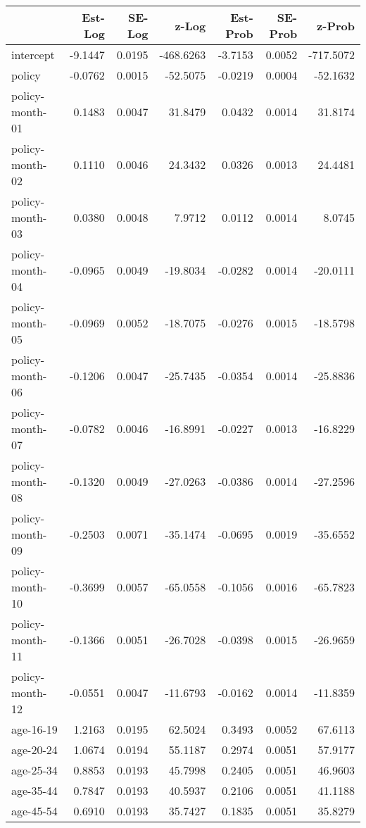 \documentclass[10pt]{article}
\begin{document}

\begin{table}[ht]
\centering
\begin{tabular}{lrrrrrr}
  \hline
 & Est-Log & SE-Log & z-Log & Est-Prob & SE-Prob & z-Prob \\ 
  \hline
intercept & -9.1447 & 0.0195 & -468.6263 & -3.7153 & 0.0052 & -717.5072 \\ 
  policy & -0.0762 & 0.0015 & -52.5075 & -0.0219 & 0.0004 & -52.1632 \\ 
  policy-month-01 & 0.1483 & 0.0047 & 31.8479 & 0.0432 & 0.0014 & 31.8174 \\ 
  policy-month-02 & 0.1110 & 0.0046 & 24.3432 & 0.0326 & 0.0013 & 24.4481 \\ 
  policy-month-03 & 0.0380 & 0.0048 & 7.9712 & 0.0112 & 0.0014 & 8.0745 \\ 
  policy-month-04 & -0.0965 & 0.0049 & -19.8034 & -0.0282 & 0.0014 & -20.0111 \\ 
  policy-month-05 & -0.0969 & 0.0052 & -18.7075 & -0.0276 & 0.0015 & -18.5798 \\ 
  policy-month-06 & -0.1206 & 0.0047 & -25.7435 & -0.0354 & 0.0014 & -25.8836 \\ 
  policy-month-07 & -0.0782 & 0.0046 & -16.8991 & -0.0227 & 0.0013 & -16.8229 \\ 
  policy-month-08 & -0.1320 & 0.0049 & -27.0263 & -0.0386 & 0.0014 & -27.2596 \\ 
  policy-month-09 & -0.2503 & 0.0071 & -35.1474 & -0.0695 & 0.0019 & -35.6552 \\ 
  policy-month-10 & -0.3699 & 0.0057 & -65.0558 & -0.1056 & 0.0016 & -65.7823 \\ 
  policy-month-11 & -0.1366 & 0.0051 & -26.7028 & -0.0398 & 0.0015 & -26.9659 \\ 
  policy-month-12 & -0.0551 & 0.0047 & -11.6793 & -0.0162 & 0.0014 & -11.8359 \\ 
  age-16-19 & 1.2163 & 0.0195 & 62.5024 & 0.3493 & 0.0052 & 67.6113 \\ 
  age-20-24 & 1.0674 & 0.0194 & 55.1187 & 0.2974 & 0.0051 & 57.9177 \\ 
  age-25-34 & 0.8853 & 0.0193 & 45.7998 & 0.2405 & 0.0051 & 46.9603 \\ 
  age-35-44 & 0.7847 & 0.0193 & 40.5937 & 0.2106 & 0.0051 & 41.1188 \\ 
  age-45-54 & 0.6910 & 0.0193 & 35.7427 & 0.1835 & 0.0051 & 35.8279 \\ 

\end{tabular}
\end{table}
\end{document}
